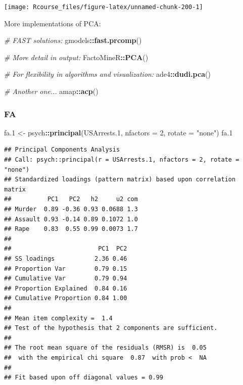 \documentclass[]{book}
\newenvironment{Shaded}{\begin{snugshade}}{\end{snugshade}}
\newcommand{\KeywordTok}[1]{\textcolor[rgb]{0.13,0.29,0.53}{\textbf{#1}}}
\newcommand{\DataTypeTok}[1]{\textcolor[rgb]{0.13,0.29,0.53}{#1}}
\newcommand{\DecValTok}[1]{\textcolor[rgb]{0.00,0.00,0.81}{#1}}
\newcommand{\StringTok}[1]{\textcolor[rgb]{0.31,0.60,0.02}{#1}}
\newcommand{\CommentTok}[1]{\textcolor[rgb]{0.56,0.35,0.01}{\textit{#1}}}
\newcommand{\OperatorTok}[1]{\textcolor[rgb]{0.81,0.36,0.00}{\textbf{#1}}}
\newcommand{\NormalTok}[1]{#1}
\theoremstyle{definition}
\theoremstyle{definition}
\theoremstyle{definition}
\theoremstyle{remark}
\begin{document}
\texttt{[image: Rcourse\_files/figure-latex/unnamed-chunk-200-1]}

More implementations of PCA:

\begin{Shaded}
\begin{Highlighting}[]
\CommentTok{# FAST solutions:}
\NormalTok{gmodels}\OperatorTok{::}\KeywordTok{fast.prcomp}\NormalTok{()}

\CommentTok{# More detail in output:}
\NormalTok{FactoMineR}\OperatorTok{::}\KeywordTok{PCA}\NormalTok{()}

\CommentTok{# For flexibility in algorithms and visualization:}
\NormalTok{ade4}\OperatorTok{::}\KeywordTok{dudi.pca}\NormalTok{()}

\CommentTok{# Another one...}
\NormalTok{amap}\OperatorTok{::}\KeywordTok{acp}\NormalTok{()}
\end{Highlighting}
\end{Shaded}

\subsubsection{FA}\label{fa}

\begin{Shaded}
\begin{Highlighting}[]
\NormalTok{fa.}\DecValTok{1}\NormalTok{ <-}\StringTok{ }\NormalTok{psych}\OperatorTok{::}\KeywordTok{principal}\NormalTok{(USArrests.}\DecValTok{1}\NormalTok{, }\DataTypeTok{nfactors =} \DecValTok{2}\NormalTok{, }\DataTypeTok{rotate =} \StringTok{"none"}\NormalTok{)}
\NormalTok{fa.}\DecValTok{1}
\end{Highlighting}
\end{Shaded}

\begin{verbatim}
## Principal Components Analysis
## Call: psych::principal(r = USArrests.1, nfactors = 2, rotate = "none")
## Standardized loadings (pattern matrix) based upon correlation matrix
##          PC1   PC2   h2     u2 com
## Murder  0.89 -0.36 0.93 0.0688 1.3
## Assault 0.93 -0.14 0.89 0.1072 1.0
## Rape    0.83  0.55 0.99 0.0073 1.7
## 
##                        PC1  PC2
## SS loadings           2.36 0.46
## Proportion Var        0.79 0.15
## Cumulative Var        0.79 0.94
## Proportion Explained  0.84 0.16
## Cumulative Proportion 0.84 1.00
## 
## Mean item complexity =  1.4
## Test of the hypothesis that 2 components are sufficient.
## 
## The root mean square of the residuals (RMSR) is  0.05 
##  with the empirical chi square  0.87  with prob <  NA 
## 
## Fit based upon off diagonal values = 0.99
\end{verbatim}
\end{document}

